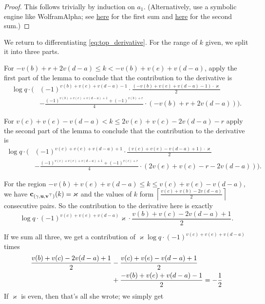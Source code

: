 \begin{proof}
  This follows trivially by induction on $a_1$.
  (Alternatively, use a symbolic engine like WolframAlpha;
  see
  \href{https://www.wolframalpha.com/input?i=sum+\%28k-a\%29*k*\%28-1\%29\%5Ek+from+k\%3Da+to+b}{here}
  for the first sum and
  \href{https://www.wolframalpha.com/input?i=sum+\%28b-k\%29*k*\%28-1\%29\%5Ek+from+k\%3Da+to+b}{here}
  for the second sum.)
\end{proof}
We return to differentiating \eqref{eq:top_derivative}.
For the range of $k$ given, we split it into three parts.
\begin{itemize}
  \ii For $-v(b) + r + 2v(d-a) \le k < -v(b) + v(e) + v(d-a)$,
  apply the first part of the lemma to conclude that the contribution to the derivative is
  \begin{align*}
    \log q \cdot \Big( & (-1)^{v(b)+v(e)+v(d-a)-1} \cdot
      \frac{(-v(b)+v(e)+v(d-a)-1) \cdot \varkappa}{2} \\
      &
      - \frac{(-1)^{v(b)+v(e)+v(d-a)+1} + (-1)^{v(b)+r}}{4} \cdot (-v(b) + r + 2v(d-a))
    \Big).
  \end{align*}

  \ii For $v(c)+v(e)-v(d-a) < k \le 2v(e)+v(c)-2v(d-a)-r$
  apply the second part of the lemma to conclude that the contribution to the derivative is
  \begin{align*}
    \log q \cdot \Big( & (-1)^{v(c)+v(e)+v(d-a)+1} \cdot
      \frac{(v(c)+v(e)-v(d-a)+1) \cdot \varkappa}{2} \\
      &
      - \frac{(-1)^{v(c)+v(e)+v(d-a)+1} + (-1)^{v(c)+r}}{4} \cdot (2v(e)+v(c)-r-2v(d-a))
    \Big).
  \end{align*}

  \ii For the region $-v(b)+v(e)+v(d-a) \le k \le v(c)+v(e)-v(d-a)$,
  we have $\mathbf c_{{(\gamma, \mathbf u, \mathbf v^\top)}}(k) = \varkappa$
  and the values of $k$ form $\left\lceil \frac{v(c)+v(b)-2v(d-a)}{2} \right\rceil$ consecutive pairs.
  So the contribution to the derivative here is exactly
  \[ \log q \cdot (-1)^{v(c)+v(e)+v(d-a)} \varkappa \cdot \frac{v(b)+v(c)-2v(d-a)+1}{2}. \]
\end{itemize}
If we sum all three,
we get a contribution of $\varkappa \log q \cdot  (-1)^{v(c)+v(e)+v(d-a)}$ times
\begin{align*}
  \frac{v(b)+v(c)-2v(d-a)+1}{2} &- \frac{v(c)+v(e)-v(d-a)+1}{2} \\
  &+ \frac{-v(b)+v(e)+v(d-a)-1}{2} = -\frac{1}{2}
\end{align*}
If $\varkappa$ is even, then that's all she wrote; we simply get
